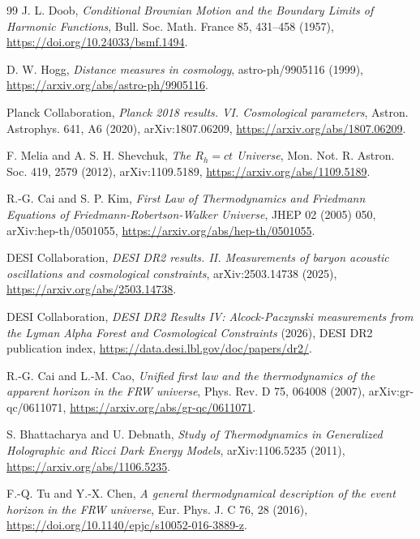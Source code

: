 \documentclass[11pt,a4paper]{article}
\begin{document}
\begin{thebibliography}{99}
J. L. Doob, \textit{Conditional Brownian Motion and the Boundary Limits of Harmonic Functions},
Bull. Soc. Math. France 85, 431--458 (1957),
\url{https://doi.org/10.24033/bsmf.1494}.



D. W. Hogg,
\textit{Distance measures in cosmology},
astro-ph/9905116 (1999),
\url{https://arxiv.org/abs/astro-ph/9905116}.

Planck Collaboration,
\textit{Planck 2018 results. VI. Cosmological parameters},
Astron. Astrophys. 641, A6 (2020),
arXiv:1807.06209,
\url{https://arxiv.org/abs/1807.06209}.

F. Melia and A. S. H. Shevchuk,
\textit{The $R_h=ct$ Universe},
Mon. Not. R. Astron. Soc. 419, 2579 (2012),
arXiv:1109.5189,
\url{https://arxiv.org/abs/1109.5189}.

R.-G. Cai and S. P. Kim,
\textit{First Law of Thermodynamics and Friedmann Equations of Friedmann-Robertson-Walker Universe},
JHEP 02 (2005) 050,
arXiv:hep-th/0501055,
\url{https://arxiv.org/abs/hep-th/0501055}.

DESI Collaboration,
\textit{DESI DR2 results. II. Measurements of baryon acoustic oscillations and cosmological constraints},
arXiv:2503.14738 (2025),
\url{https://arxiv.org/abs/2503.14738}.

DESI Collaboration,
\textit{DESI DR2 Results IV: Alcock-Paczynski measurements from the Lyman Alpha Forest and Cosmological Constraints} (2026),
DESI DR2 publication index,
\url{https://data.desi.lbl.gov/doc/papers/dr2/}.


R.-G. Cai and L.-M. Cao,
\textit{Unified first law and the thermodynamics of the apparent horizon in the FRW universe},
Phys. Rev. D 75, 064008 (2007),
arXiv:gr-qc/0611071,
\url{https://arxiv.org/abs/gr-qc/0611071}.

S. Bhattacharya and U. Debnath,
\textit{Study of Thermodynamics in Generalized Holographic and Ricci Dark Energy Models},
arXiv:1106.5235 (2011),
\url{https://arxiv.org/abs/1106.5235}.

F.-Q. Tu and Y.-X. Chen,
\textit{A general thermodynamical description of the event horizon in the FRW universe},
Eur. Phys. J. C 76, 28 (2016),
\url{https://doi.org/10.1140/epjc/s10052-016-3889-z}.


\end{thebibliography}
\end{document}
